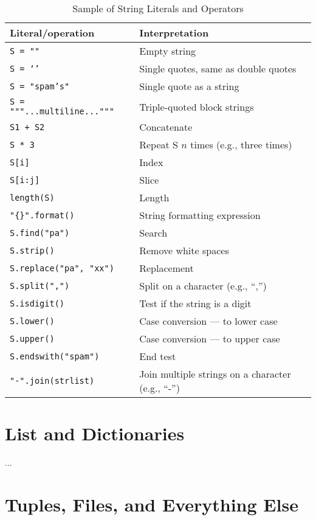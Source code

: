 \documentclass[a4paper,11pt]{book}
\begin{document}
\begin{table}[!htbp]
	\centering
	\caption{Sample of String Literals and Operators}
	\label{tab:string_literals_and_operators}
	\begin{tabular}{ll}
		\toprule \toprule
		Literal/operation & Interpretation \\
		\midrule
		\texttt{S = ""}} &  Empty string \\
		\texttt{S = `'} &   Single quotes, same as double quotes \\
		\texttt{S = "spam's"} & Single quote as a string \\
		\texttt{S = """...multiline..."""} & Triple-quoted block strings \\
		\texttt{S1 + S2} & Concatenate \\
		\texttt{S * 3} & Repeat S $n$ times (e.g., three times)\\
		\texttt{S[i]} & Index \\
		\texttt{S[i:j]} & Slice \\
		\texttt{length(S)} & Length \\
		\texttt{"\{\}".format()} & String formatting expression \\ 
		\texttt{S.find("pa")} & Search \\
		\texttt{S.strip()} & Remove white spaces \\
		\texttt{S.replace("pa", "xx")} & Replacement \\
		\texttt{S.split(",")} & Split on a character (e.g., ``,'') \\
		\texttt{S.isdigit()} & Test if the string is a digit \\
		\texttt{S.lower()} & Case conversion --- to lower case \\
		\texttt{S.upper()} & Case conversion --- to upper case \\
		\texttt{S.endswith("spam")} & End test \\
		\texttt{"-".join(strlist)} & Join multiple strings on a character (e.g., ``-'')\\
		\bottomrule
	\end{tabular}
\end{table}

\section{List and Dictionaries}

...


\section{Tuples, Files, and Everything Else}
\end{document}
